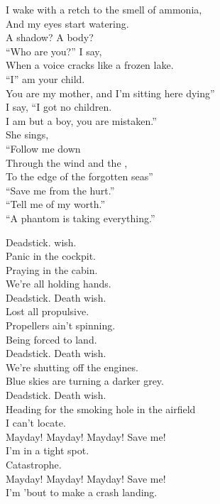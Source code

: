 
I wake with a retch to the smell of ammonia, \\
And my eyes start watering. \\
A shadow? A body? \\
``Who are you?'' I say, \\
When a voice cracks like a frozen lake. \\
``I'' am your child. \\
You are my mother, and I'm sitting here dying'' \\
I say, ``I got no children. \\
I am but a boy, you are mistaken.'' \\

She sings, \\
``Follow me down \\
Through the wind and the , \\
To the edge of the forgotten seas'' \\
``Save me from the hurt.'' \\
``Tell me of my worth.'' \\
``A phantom is taking everything.'' \\


Deadstick.  wish. \\
Panic in the cockpit. \\
Praying in the cabin. \\
We're all holding hands. \\
Deadstick. Death wish. \\
Lost all propulsive. \\
Propellers ain't spinning. \\
Being forced to land. \\

Deadstick. Death wish. \\
We're shutting off the engines. \\
Blue skies are turning a darker grey. \\
Deadstick. Death wish. \\
Heading for the smoking hole in the airfield \\
I can't locate. \\

Mayday! Mayday! Mayday! Save me! \\
I'm in a tight spot. \\
Catastrophe. \\
Mayday! Mayday! Mayday! Save me! \\
I'm 'bout to make a crash landing. \\

